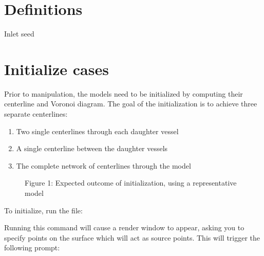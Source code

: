 \documentclass[letterpaper,10pt,english]{sphinxmanual}
\begin{document}
\section{Definitions}
\label{\detokenize{getting_started:definitions}}
Inlet seed


\section{Initialize cases}
\label{\detokenize{getting_started:initialize-cases}}
Prior to manipulation, the models need to be initialized by computing their centerline and Voronoi diagram.
The goal of the initialization is to achieve three separate centerlines:
\begin{enumerate}
\item {} 
Two single centerlines through each daughter vessel

\item {} 
A single centerline between the daughter vessels

\item {} 
The complete network of centerlines through the model

\end{enumerate}

\begin{figure}[htbp]
\centering
\capstart

\noindent{}
\caption{Figure 1: Expected outcome of initialization, using a representative model}\label{\detokenize{getting_started:id1}}\end{figure}

To initialize, run the  file:

%
\begin{sphinxVerbatim}[commandchars=\\\{\}]
   
\end{sphinxVerbatim}

Running this command will cause a render window to appear, asking you to specify points on the surface which will act as source points.
This will trigger the following prompt:

%
\begin{sphinxVerbatim}[commandchars=\\\{\}]
             
\end{sphinxVerbatim}
\end{document}
